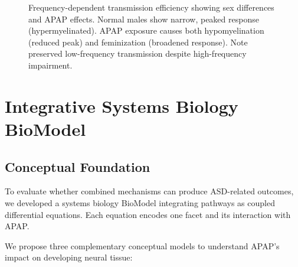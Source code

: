 \documentclass[12pt]{article}
\begin{document}
\begin{figure}[h]
\centering
{}
\caption{Frequency-dependent transmission efficiency showing sex differences and APAP effects. Normal males show narrow, peaked response (hypermyelinated). APAP exposure causes both hypomyelination (reduced peak) and feminization (broadened response). Note preserved low-frequency transmission despite high-frequency impairment.}
\label{fig:frequency}
\end{figure}

\section{Integrative Systems Biology BioModel}

\subsection{Conceptual Foundation}
To evaluate whether combined mechanisms can produce ASD-related outcomes, we developed a systems biology BioModel integrating pathways as coupled differential equations. Each equation encodes one facet and its interaction with APAP.

We propose three complementary conceptual models to understand APAP's impact on developing neural tissue:
\end{document}
